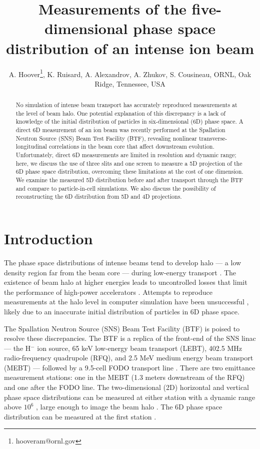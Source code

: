 \documentclass[letterpaper,
               keeplastbox,
               nospread,
               biblatex,
              ]{jacow}
\begin{document}
\title{Measurements of the five-dimensional phase space distribution of an intense ion beam}

\author{A. Hoover\thanks{hooveram@ornl.gov}, K. Ruisard, A. Alexandrov, A. Zhukov, S. Cousineau, ORNL, Oak Ridge, Tennessee, USA}
	
\maketitle

%
\begin{abstract}
No simulation of intense beam transport has accurately reproduced measurements at the level of beam halo. One potential explanation of this discrepancy is a lack of knowledge of the initial distribution of particles in six-dimensional (6D) phase space. A direct 6D measurement of an ion beam was recently performed at the Spallation Neutron Source (SNS) Beam Test Facility (BTF), revealing nonlinear transverse-longitudinal correlations in the beam core that affect downstream evolution. Unfortunately, direct 6D measurements are limited in resolution and dynamic range; here, we discuss the use of three slits and one screen to measure a 5D projection of the 6D phase space distribution, overcoming these limitations at the cost of one dimension. We examine the measured 5D distribution before and after transport through the BTF and compare to particle-in-cell simulations. We also discuss the possibility of reconstructing the 6D distribution from 5D and 4D projections.
\end{abstract}

\section{Introduction}

The phase space distributions of intense beams tend to develop halo — a low density region far from the beam core — during low-energy transport \cite{Batygin2021}. The existence of beam halo at higher energies leads to uncontrolled losses that limit the performance of high-power accelerators \cite{Henderson2014}. Attempts to reproduce measurements at the halo level in computer simulation have been unsuccessful \cite{Allen2002, Qiang2002, Groening2008}, likely due to an inaccurate initial distribution of particles in 6D phase space.

The Spallation Neutron Source (SNS) Beam Test Facility (BTF) is poised to resolve these discrepancies. The BTF is a replica of the front-end of the SNS linac — the H$^-$ ion source, 65 keV low-energy beam transport (LEBT), 402.5 MHz radio-frequency quadrupole (RFQ), and 2.5 MeV medium energy beam transport (MEBT) — followed by a 9.5-cell FODO transport line \cite{Zhang2020}. There are two emittance measurement stations: one in the MEBT (1.3 meters downstream of the RFQ) and one after the FODO line. The two-dimensional (2D) horizontal and vertical phase space distributions can be measured at either station with a dynamic range above $10^6$ \cite{Aleksandrov2021}, large enough to image the beam halo \cite{Aleksandrov2020}. The 6D phase space distribution can be measured at the first station \cite{Cathey2018}. 
\end{document}
